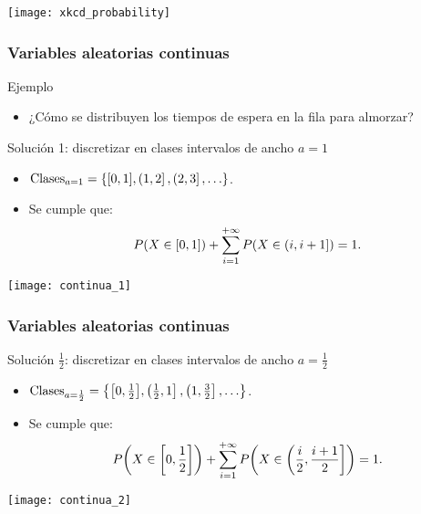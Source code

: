 \documentclass[table]{beamer}
\begin{document}
\begin{frame}
    \begin{center}
        \texttt{[image: xkcd\_probability]}
    \end{center}
\end{frame}

\begin{frame}
    \frametitle{Variables aleatorias continuas}
    \begin{exampleblock}{Ejemplo}
        \begin{itemize}
            \item ¿Cómo se distribuyen los tiempos de espera en la fila para almorzar?
        \end{itemize}
    \end{exampleblock}
    \begin{block}{Solución 1: discretizar en clases intervalos de ancho $a = 1$}
        \begin{itemize}
            \item $\text{Clases}_{a = 1} = \bparens{\sparens{0 , 1}, \left ( 1, 2 \right ] , \left ( 2, 3 \right ] , \ldots}$.
            \item Se cumple que:
            \begin{equation*}
                \prob{X \in \sparens{0, 1}} + \sum_{i = 1}^{+ \infty} \prob{X \in \left ( i, i + 1 \right ]} = 1 .
            \end{equation*}
        \end{itemize}
    \end{block}
    \begin{center}
        \texttt{[image: continua\_1]}
    \end{center}
\end{frame}

\begin{frame}
    \frametitle{Variables aleatorias continuas}
    \begin{block}{Solución $\frac{1}{2}$: discretizar en clases intervalos de ancho $a = \frac{1}{2}$}
        \begin{itemize}
            \item $\text{Clases}_{a = \frac{1}{2}} = \bparens{\sparens{0 , \frac{1}{2}}, \left ( \frac{1}{2} , 1 \right ] , \left ( 1 , \frac{3}{2} \right ] , \ldots}$.
            \item Se cumple que:
                \begin{equation*}
                    \prob{X \in \sparens{0, \frac{1}{2}}} + \sum_{i = 1}^{+ \infty} \prob{X \in \left ( \frac{i}{2}, \frac{i + 1}{2} \right ]} = 1 .
                \end{equation*}
        \end{itemize}
    \end{block}
    \begin{center}
        \texttt{[image: continua\_2]}
    \end{center}
\end{frame}
\end{document}
